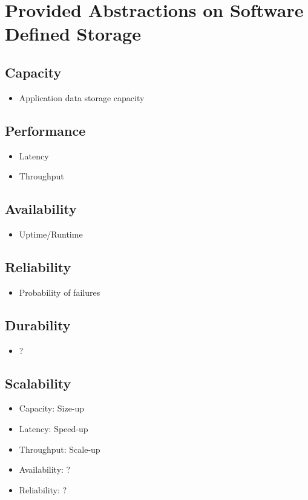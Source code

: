 
\section{Provided Abstractions on Software Defined Storage}
\subsection{Capacity}
	\begin{itemize}
		\item Application data storage capacity
	\end{itemize}
\subsection{Performance}
	\begin{itemize}
		\item Latency
		\item Throughput
	\end{itemize}
\subsection{Availability}
	\begin{itemize}
		\item Uptime/Runtime
	\end{itemize}
\subsection{Reliability}
	\begin{itemize}
		\item Probability of failures
	\end{itemize}
\subsection{Durability}
	\begin{itemize}
		\item ?
	\end{itemize}
\subsection{Scalability}
	\begin{itemize}
		\item Capacity: Size-up
		\item Latency: Speed-up
		\item Throughput: Scale-up
		\item Availability: ?
		\item Reliability: ?
	\end{itemize}
